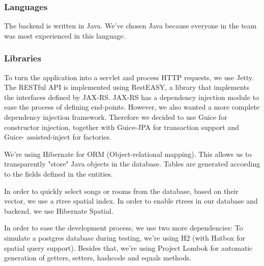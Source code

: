 \subsubsection{Languages}
The backend is written in Java.
We've chosen Java because everyone in the team was most experienced in this language.

\subsubsection{Libraries}
To turn the application into a servlet and process HTTP requests, we use Jetty.
The RESTful API is implemented using RestEASY, a library that implements the interfaces defined by JAX-RS.
JAX-RS has a dependency injection module to ease the process of defining end-points.
However, we also wanted a more complete dependency injection framework.
Therefore we decided to use Guice for constructor injection, together with Guice-JPA for transaction support and Guice- assisted-inject for factories.

We're using Hibernate for ORM (Object-relational mapping).
This allows us to transparently "store" Java objects in the database.
Tables are generated according to the fields defined in the entities.

In order to quickly select songs or rooms from the database, based on their vector, we use a \gls{rtree} spatial index.
In order to enable  \glspl{rtree} in our database and backend, we use Hibernate Spatial.

In order to ease the development process, we use two more dependencies:
To simulate a postgres database during testing, we're using H2 (with Hatbox for spatial query support).
Besides that, we're using Project Lombok for automatic generation of getters, setters, hashcode and equals methods.
